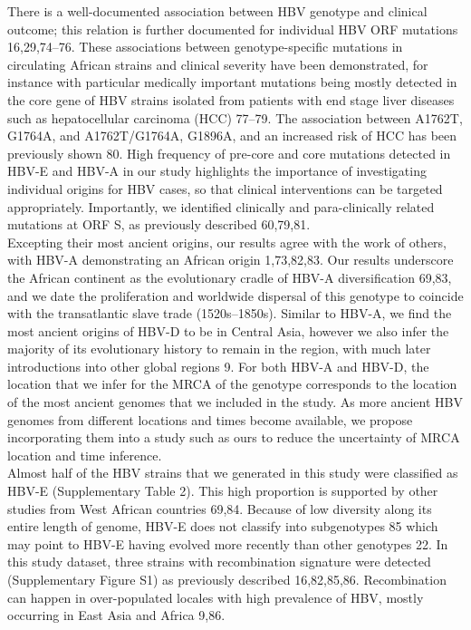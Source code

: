 There is a well-documented association between HBV genotype and clinical outcome; this relation is further documented for individual HBV ORF mutations 16,29,74–76. These associations between genotype-specific mutations in circulating African strains and clinical severity have been demonstrated, for instance with particular medically important mutations being mostly detected in the core gene of HBV strains isolated from patients with end stage liver diseases such as hepatocellular carcinoma (HCC) 77–79. The association between A1762T, G1764A, and A1762T/G1764A, G1896A, and an increased risk of HCC has been previously shown 80. High frequency of pre-core and core mutations detected in HBV-E and HBV-A in our study highlights the importance of investigating individual origins for HBV cases, so that clinical interventions can be targeted appropriately. Importantly, we identified clinically and para-clinically related mutations at ORF S, as previously described 60,79,81.\\

Excepting their most ancient origins, our results agree with the work of others, with HBV-A demonstrating an African origin 1,73,82,83. Our results underscore the African continent as the evolutionary cradle of HBV-A diversification 69,83, and we date the proliferation and worldwide dispersal of this genotype to coincide with the transatlantic slave trade (1520s–1850s). Similar to HBV-A, we find the most ancient origins of HBV-D to be in Central Asia, however we also infer the majority of its evolutionary history to remain in the region, with much later introductions into other global regions 9. For both HBV-A and HBV-D, the location that we infer for the MRCA of the genotype corresponds to the location of the most ancient genomes that we included in the study. As more ancient HBV genomes from different locations and times become available, we propose incorporating them into a study such as ours to reduce the uncertainty of MRCA location and time inference.\\

Almost half of the HBV strains that we generated in this study were classified as HBV-E (Supplementary Table 2). This high proportion is supported by other studies from West African countries 69,84. Because of low diversity along its entire length of genome, HBV-E does not classify into subgenotypes 85 which may point to HBV-E having evolved more recently than other genotypes 22. In this study dataset, three strains with recombination signature were detected (Supplementary Figure S1) as previously described 16,82,85,86. Recombination can happen in over-populated locales with high prevalence of HBV, mostly occurring in East Asia and Africa 9,86.\\

